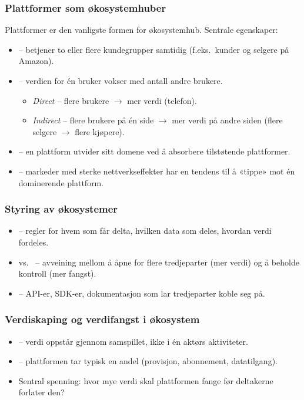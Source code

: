 
\subsubsection*{Plattformer som økosystemhuber}
Plattformer er den vanligste formen for økosystemhub. Sentrale egenskaper:
\begin{itemize}
  \item {} -- betjener to eller flere kundegrupper
    samtidig (f.eks.\ kunder og selgere på Amazon).
  \item {} -- verdien for én bruker vokser med antall
    andre brukere.
    \begin{itemize}
      \item \emph{Direct} -- flere brukere $\rightarrow$ mer verdi (telefon).
      \item \emph{Indirect} -- flere brukere på én side $\rightarrow$ mer
        verdi på andre siden (flere selgere $\rightarrow$ flere kjøpere).
    \end{itemize}
  \item {} -- en plattform utvider sitt domene ved å
    absorbere tilstøtende plattformer.
  \item {} -- markeder med sterke nettverkseffekter har en
    tendens til å «tippe» mot én dominerende plattform.
\end{itemize}

\subsubsection*{Styring av økosystemer}
\begin{itemize}
  \item {} -- regler for hvem som får delta, hvilken
    data som deles, hvordan verdi fordeles.
  \item {} vs.\  -- avveining mellom å åpne for
    flere tredjeparter (mer verdi) og å beholde kontroll (mer fangst).
  \item {} -- API-er, SDK-er, dokumentasjon som lar
    tredjeparter koble seg på.
\end{itemize}

\subsubsection*{Verdiskaping og verdifangst i økosystem}
\begin{itemize}
  \item {} -- verdi oppstår gjennom samspillet, ikke i én
    aktørs aktiviteter.
  \item {} -- plattformen tar typisk en andel (provisjon,
    abonnement, datatilgang).
  \item Sentral spenning: hvor mye verdi skal plattformen fange før
    deltakerne forlater den?
\end{itemize}

